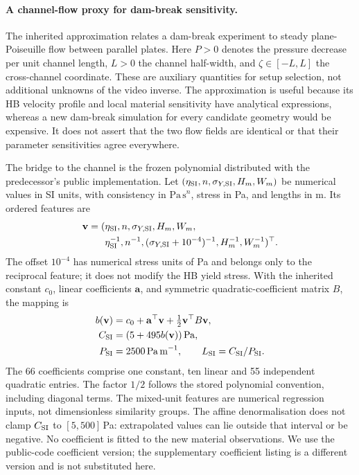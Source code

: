 \paragraph{A channel-flow proxy for dam-break sensitivity.}
The inherited approximation relates a dam-break experiment to steady
plane-Poiseuille flow between parallel plates. Here $P>0$ denotes the
pressure decrease per unit channel length, $L>0$ the channel half-width,
and $\zeta\in[-L,L]$ the cross-channel coordinate. These are auxiliary
quantities for setup selection, not additional unknowns of the video
inverse. The approximation is useful because its HB velocity profile
and local material sensitivity have analytical expressions, whereas a
new dam-break simulation for every candidate geometry would be expensive.
It does not assert that the two flow fields are identical or that their
parameter sensitivities agree everywhere.

The bridge to the channel is the frozen polynomial distributed with
the predecessor's public implementation. Let
$(\eta_{\rm SI},n,\sigma_{Y,\rm SI},H_m,W_m)$ be numerical values in
SI units, with consistency in $\mathrm{Pa\,s}^{n}$, stress in Pa, and
lengths in m. Its ordered features are
\begin{equation}
\label{eq:bridge-features}
\begin{aligned}
 \mathbf v=(&\eta_{\rm SI},n,\sigma_{Y,\rm SI},H_m,W_m,\\
 &\eta_{\rm SI}^{-1},n^{-1},
 (\sigma_{Y,\rm SI}+10^{-4})^{-1},H_m^{-1},W_m^{-1})^\top.
\end{aligned}
\end{equation}
The offset $10^{-4}$ has numerical stress units of Pa and belongs only
to the reciprocal feature; it does not modify the HB yield stress.
With the inherited constant $c_0$, linear coefficients $\mathbf a$,
and symmetric quadratic-coefficient matrix $B$, the mapping is
\begin{equation}
\label{eq:bridge-map}
\begin{aligned}
 b(\mathbf v)&=c_0+\mathbf a^\top\mathbf v
                    +\tfrac12\mathbf v^\top B\mathbf v,\\
 C_{\rm SI}&=(5+495b(\mathbf v))\,\mathrm{Pa},\\
 P_{\rm SI}&=2500\,\mathrm{Pa\,m}^{-1},\qquad
 L_{\rm SI}=C_{\rm SI}/P_{\rm SI}.
\end{aligned}
\end{equation}
The 66 coefficients comprise one constant, ten linear and 55 independent
quadratic entries. The factor $1/2$ follows the stored polynomial
convention, including diagonal terms. The mixed-unit features are
numerical regression inputs, not dimensionless similarity groups.
The affine denormalisation does not clamp $C_{\rm SI}$ to
$[5,500]$\,Pa: extrapolated values can lie outside that interval or
be negative. No coefficient is fitted to the new material observations.
We use the public-code coefficient version; the supplementary
coefficient listing is a different version and is not substituted here.


